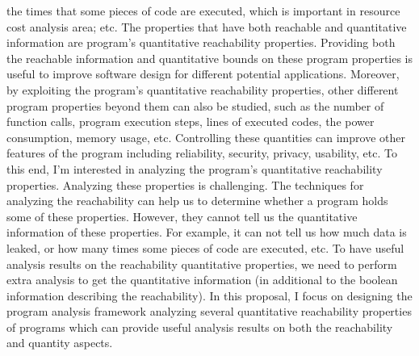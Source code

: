 the times that some pieces of code are executed, which is important in resource cost analysis area; etc.
The properties that have both reachable and quantitative information are
program's quantitative reachability properties.
Providing both the reachable information and quantitative bounds on 
these program properties is useful to improve software design for different potential applications.
Moreover, 
by exploiting the program's quantitative reachability properties,
other different program properties beyond them can also be 
studied,
such as the number of function calls,
program execution steps,
lines of executed codes,
the power consumption, memory usage, etc. 
Controlling
these quantities
can improve other features of the program including reliability, security, privacy, usability, etc.
To this end, I'm interested in
analyzing the program's quantitative reachability properties.
Analyzing these properties is challenging.
The techniques for analyzing the reachability can help us to determine whether a program holds some of these properties.
However, they cannot tell us
the quantitative information of these properties.
For example, it can not tell us how much data is leaked, or
how many times some pieces of code are executed, etc.
To have useful analysis results on the reachability quantitative properties,
we need to perform extra analysis
to get the quantitative information
(in additional to the boolean information describing the reachability).
In this proposal, I focus on designing
the program analysis framework analyzing several quantitative reachability properties of programs
which can provide useful analysis results on both the reachability and quantity aspects.

